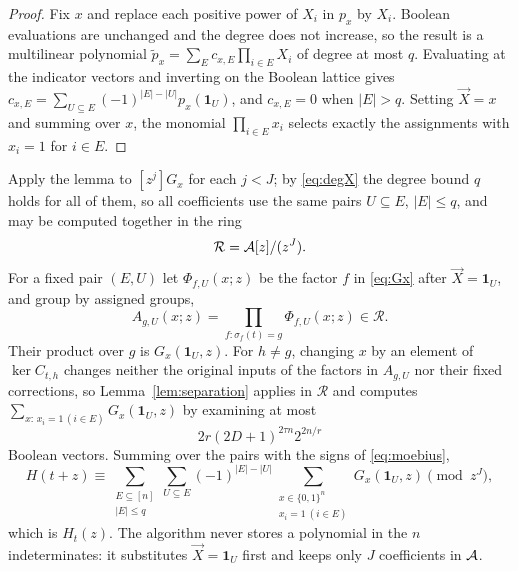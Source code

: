 \begin{proof}
Fix $x$ and replace each positive power of $X_i$ in $p_x$ by $X_i$. Boolean
evaluations are unchanged and the degree does not increase, so the result is a
multilinear polynomial $\tilde p_x=\sum_{E}c_{x,E}\prod_{i\in E}X_i$ of degree
at most $q$. Evaluating at the indicator vectors and inverting on the Boolean
lattice gives $c_{x,E}=\sum_{U\subseteq E}(-1)^{|E|-|U|}p_x(\mathbf 1_U)$, and
$c_{x,E}=0$ when $|E|>q$. Setting $\vec X=x$ and summing over $x$, the monomial
$\prod_{i\in E}x_i$ selects exactly the assignments with $x_i=1$ for $i\in E$.
\end{proof}

Apply the lemma to $[z^j]G_x$ for each $j<J$; by \eqref{eq:degX} the degree bound
$q$ holds for all of them, so all coefficients use the same pairs $U\subseteq E$,
$|E|\le q$, and may be computed together in the ring
\begin{equation}\label{eq:Rring}
  \mathcal R=\mathcal{A}[z]/(z^{J}).
\end{equation}
For a fixed pair $(E,U)$ let $\Phi_{f,U}(x;z)$ be the factor $f$ in
\eqref{eq:Gx} after $\vec X=\mathbf 1_U$, and group by assigned groups,
\begin{equation}\label{eq:AgU}
  A_{g,U}(x;z)=\prod_{f:\sigma_f(t)=g}\Phi_{f,U}(x;z)\in\mathcal R .
\end{equation}
Their product over $g$ is $G_x(\mathbf 1_U,z)$. For $h\ne g$, changing $x$ by an
element of $\ker C_{t,h}$ changes neither the original inputs of the factors in
$A_{g,U}$ nor their fixed corrections, so Lemma~\ref{lem:separation} applies in
$\mathcal R$ and computes $\sum_{x:\,x_i=1\,(i\in E)}G_x(\mathbf 1_U,z)$ by
examining at most
\begin{equation}\label{eq:pervectors}
  2r(2D+1)^{2\tau n}2^{2n/r}
\end{equation}
Boolean vectors. Summing over the pairs with the signs of \eqref{eq:moebius},
\begin{equation}\label{eq:Htsum}
  H(t+z)\equiv\sum_{\substack{E\subseteq[n]\\|E|\le q}}\sum_{U\subseteq E}(-1)^{|E|-|U|}
  \sum_{\substack{x\in\{0,1\}^n\\ x_i=1\ (i\in E)}}G_x(\mathbf 1_U,z)\pmod{z^{J}},
\end{equation}
which is $H_t(z)$. The algorithm never stores a polynomial in the $n$
indeterminates: it substitutes $\vec X=\mathbf 1_U$ first and keeps only $J$
coefficients in $\mathcal{A}$.


